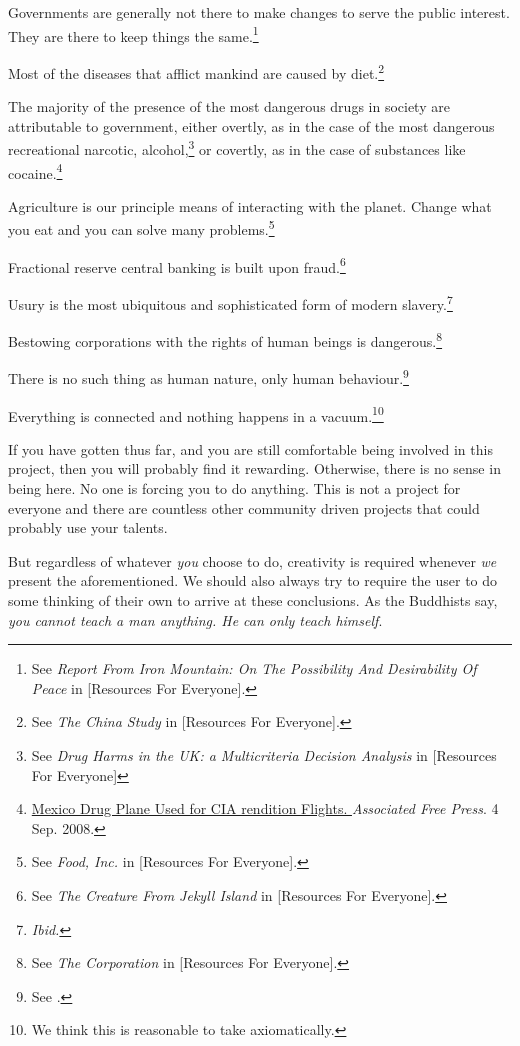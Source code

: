 \item
Governments are generally not there to make changes to serve the public interest. They are there to keep things the same.\footnote{See {\it Report From Iron Mountain: On The Possibility And Desirability Of Peace} in [Resources For Everyone].}

\item
Most of the diseases that afflict mankind are caused by diet.\footnote{See {\it The China Study} in [Resources For Everyone].}

\item
The majority of the presence of the most dangerous drugs in society are attributable to government, either overtly, as in the case of the most dangerous recreational narcotic, alcohol,\footnote{See {\it Drug Harms in the UK: a Multicriteria Decision Analysis} in [Resources For Everyone]} or covertly, as in the case of substances like cocaine.\footnote{\href{http://afp.google.com/article/ALeqM5j6QonBKKMo2gw1e3ql-xUcQEZbVg}{Mexico Drug Plane Used for CIA rendition Flights. }{\it Associated Free Press}. 4 Sep. 2008.}

\item
Agriculture is our principle means of interacting with the planet. Change what you eat and you can solve many problems.\footnote{See {\it Food, Inc.} in [Resources For Everyone].}

\item
Fractional reserve central banking is built upon fraud.\footnote{See {\it The Creature From Jekyll Island} in [Resources For Everyone].}

\item
Usury is the most ubiquitous and sophisticated form of modern slavery.\footnote{{\it Ibid.}}

\item
Bestowing corporations with the rights of human beings is dangerous.\footnote{See {\it The Corporation} in [Resources For Everyone].}

\item
There is no such thing as human nature, only human behaviour.\footnote{See .}

\item
Everything is connected and nothing happens in a vacuum.\footnote{We think this is reasonable to take axiomatically.}
\stopitemize

If you have gotten thus far, and you are still comfortable being involved in this project, then you will probably find it rewarding. Otherwise, there is no sense in being here. No one is forcing you to do anything. This is not a project for everyone and there are countless other community driven projects that could probably use your talents.

But regardless of whatever {\it you} choose to do, creativity is required whenever {\it we} present the aforementioned. We should also always try to require the user to do some thinking of their own to arrive at these conclusions. As the Buddhists say, {\it you cannot teach a man anything. He can only teach himself}.

\StopChapter

